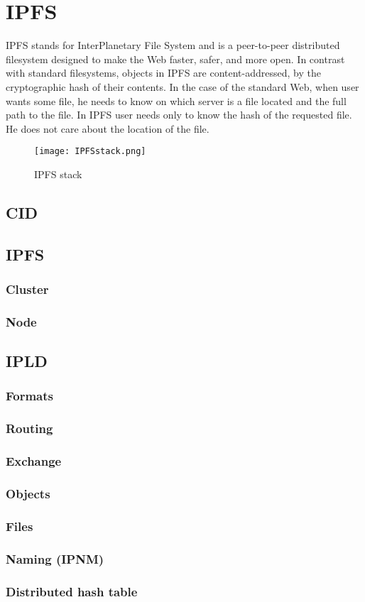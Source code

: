 \chapter{IPFS}

IPFS stands for InterPlanetary File System and is a peer-to-peer distributed filesystem designed to make the Web faster, safer, and more open. In contrast with standard filesystems, objects in IPFS are content-addressed, by the cryptographic hash of their contents. In the case of the standard Web, when user wants some file, he needs to know on which server is a file located and the full path to the file. In IPFS user needs only to know the hash of the requested file. He does not care about the location of the file.

\begin{figure}[H]
    \centering
    \texttt{[image: IPFSstack.png]}
    \caption{IPFS stack}
    \label{}
\end{figure}


\section{CID}



\section{IPFS}
\subsection{Cluster}
\subsection{Node}



\section{IPLD}
\subsection{Formats} 
\subsection{Routing} 
\subsection{Exchange} 
\subsection{Objects}  
\subsection{Files}  
\subsection{Naming (IPNM)}  
\subsection{Distributed hash table} 




